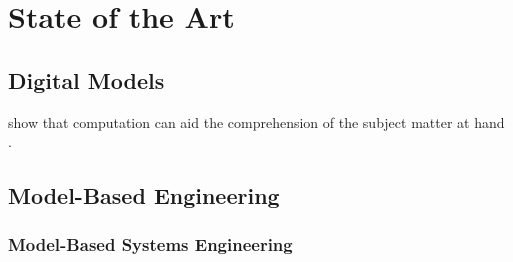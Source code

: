 \chapter{State of the Art}
\label{sec:state-of-the-art}

\section{Digital Models}
\label{sec:digital-models}
\autocite{hinsen_computational_2014}
\autocite{hinsen_scientific_2016}
\citeauthor{sussman_role_2002} show that computation can aid the comprehension of the subject matter at hand \autocite{sussman_role_2002}.

\section{Model-Based Engineering}
\label{sec:model-based-engineering}

\subsection{Model-Based Systems Engineering}
\label{sec:model-based-systems-engineering}
